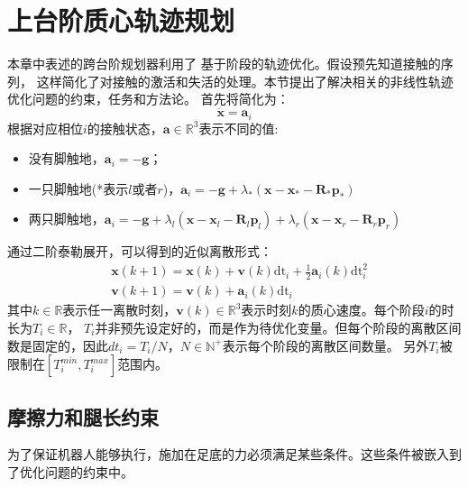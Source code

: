 \section{上台阶质心轨迹规划}
\label{sec:traj_plan}
本章中表述的跨台阶规划器利用了
基于阶段的轨迹优化。假设预先知道接触的序列，
这样简化了对接触的激活和失活的处理。本节提出了解决相关的非线性轨迹优化问题的约束，任务和方法论。
首先将简化为：
\begin{equation}
    \label{equ:acceleration}
    \ddot{\boldsymbol{x}} = \boldsymbol{a}_i
\end{equation}
根据对应相位$i$的接触状态，$\boldsymbol{a} \in \mathbb{R}^{3}$表示不同的值:
\begin{itemize}
    \item 没有脚触地，$\boldsymbol{a}_i = -\boldsymbol{g}$；
    \item 一只脚触地(*表示$l$或者$r$)，$\boldsymbol{a}_i=-\boldsymbol{g}+\lambda_*\left(\boldsymbol{x}-\boldsymbol{x}_*-\boldsymbol{R}_* \boldsymbol{p}_*\right)$
    \item 两只脚触地，$\boldsymbol{a}_i=-\boldsymbol{g}+\lambda_l\left(\boldsymbol{x}-\boldsymbol{x}_l-\boldsymbol{R}_l \boldsymbol{p}_l\right)
                    +\lambda_r\left(\boldsymbol{x}-\boldsymbol{x}_r-\boldsymbol{R}_r \boldsymbol{p}_r\right)$
\end{itemize}
通过二阶泰勒展开，可以得到的近似离散形式：
\begin{equation}
    \label{equ:approx_acc}
    \begin{aligned}
        & \boldsymbol{x}(k+1)=\boldsymbol{x}(k)+\boldsymbol{v}(k) \mathrm{dt}_i+\frac{1}{2} \boldsymbol{a}_i(k) \mathrm{dt}_i^2 \\
        & \boldsymbol{v}(k+1)=\boldsymbol{v}(k)+\boldsymbol{a}_i(k) \mathrm{dt}_i
        \end{aligned}
\end{equation}
其中$k \in \mathbb{R}$表示任一离散时刻，$\boldsymbol{v}(k) \in \mathbb{R}^{3}$表示时刻$k$的质心速度。每个阶段$i$的时长为$T_i \in \mathbb{R}$，
$T_i$并非预先设定好的，而是作为待优化变量。但每个阶段的离散区间数是固定的，因此$dt_i=T_i/N$，$N\in \mathbb{N}^+$表示每个阶段的离散区间数量。
另外$T_i$被限制在$[T_i^{min}, T_i^{max}]$范围内。
\subsection{摩擦力和腿长约束}
\label{constraints}
为了保证机器人能够执行，施加在足底的力必须满足某些条件。这些条件被嵌入到了优化问题的约束中。

